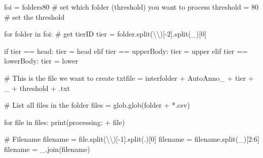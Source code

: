 \documentclass[
  letterpaper,
  DIV=11,
  numbers=noendperiod]{scrreprt}
\newenvironment{Shaded}{\begin{snugshade}}{\end{snugshade}}
\newcommand{\BuiltInTok}[1]{\textcolor[rgb]{0.00,0.23,0.31}{#1}}
\newcommand{\CharTok}[1]{\textcolor[rgb]{0.13,0.47,0.30}{#1}}
\newcommand{\CommentTok}[1]{\textcolor[rgb]{0.37,0.37,0.37}{#1}}
\newcommand{\ControlFlowTok}[1]{\textcolor[rgb]{0.00,0.23,0.31}{#1}}
\newcommand{\DecValTok}[1]{\textcolor[rgb]{0.68,0.00,0.00}{#1}}
\newcommand{\KeywordTok}[1]{\textcolor[rgb]{0.00,0.23,0.31}{#1}}
\newcommand{\NormalTok}[1]{\textcolor[rgb]{0.00,0.23,0.31}{#1}}
\newcommand{\OperatorTok}[1]{\textcolor[rgb]{0.37,0.37,0.37}{#1}}
\newcommand{\StringTok}[1]{\textcolor[rgb]{0.13,0.47,0.30}{#1}}
\begin{document}
\begin{Shaded}
\begin{Highlighting}[]
\NormalTok{foi }\OperatorTok{=}\NormalTok{ folders80 }\CommentTok{\# set which folder (threshold) you want to process}
\NormalTok{threshold }\OperatorTok{=} \StringTok{\textquotesingle{}80\textquotesingle{}} \CommentTok{\# set the threshold}

\ControlFlowTok{for}\NormalTok{ folder }\KeywordTok{in}\NormalTok{ foi:}
    \CommentTok{\# get tierID}
\NormalTok{    tier }\OperatorTok{=}\NormalTok{ folder.split(}\StringTok{\textquotesingle{}}\CharTok{\textbackslash{}\textbackslash{}}\StringTok{\textquotesingle{}}\NormalTok{)[}\OperatorTok{{-}}\DecValTok{2}\NormalTok{].split(}\StringTok{\textquotesingle{}\_\textquotesingle{}}\NormalTok{)[}\DecValTok{0}\NormalTok{]}

    \ControlFlowTok{if}\NormalTok{ tier }\OperatorTok{==} \StringTok{\textquotesingle{}head\textquotesingle{}}\NormalTok{:}
\NormalTok{        tier }\OperatorTok{=} \StringTok{\textquotesingle{}head\textquotesingle{}}
    \ControlFlowTok{elif}\NormalTok{ tier }\OperatorTok{==} \StringTok{\textquotesingle{}upperBody\textquotesingle{}}\NormalTok{:}
\NormalTok{        tier }\OperatorTok{=} \StringTok{\textquotesingle{}upper\textquotesingle{}}
    \ControlFlowTok{elif}\NormalTok{ tier }\OperatorTok{==} \StringTok{\textquotesingle{}lowerBody\textquotesingle{}}\NormalTok{:}
\NormalTok{        tier }\OperatorTok{=} \StringTok{\textquotesingle{}lower\textquotesingle{}}

    \CommentTok{\# This is the file we want to create}
\NormalTok{    txtfile }\OperatorTok{=}\NormalTok{ interfolder }\OperatorTok{+} \StringTok{\textquotesingle{}AutoAnno\_\textquotesingle{}} \OperatorTok{+}\NormalTok{ tier }\OperatorTok{+} \StringTok{\textquotesingle{}\_\textquotesingle{}} \OperatorTok{+}\NormalTok{ threshold }\OperatorTok{+} \StringTok{\textquotesingle{}.txt\textquotesingle{}}

    \CommentTok{\# List all files in the folder}
\NormalTok{    files }\OperatorTok{=}\NormalTok{ glob.glob(folder }\OperatorTok{+} \StringTok{\textquotesingle{}*.csv\textquotesingle{}}\NormalTok{)}

    \ControlFlowTok{for} \BuiltInTok{file} \KeywordTok{in}\NormalTok{ files:}
        \BuiltInTok{print}\NormalTok{(}\StringTok{\textquotesingle{}processing: \textquotesingle{}} \OperatorTok{+} \BuiltInTok{file}\NormalTok{)}

        \CommentTok{\# Filename}
\NormalTok{        filename }\OperatorTok{=} \BuiltInTok{file}\NormalTok{.split(}\StringTok{\textquotesingle{}}\CharTok{\textbackslash{}\textbackslash{}}\StringTok{\textquotesingle{}}\NormalTok{)[}\OperatorTok{{-}}\DecValTok{1}\NormalTok{].split(}\StringTok{\textquotesingle{}.\textquotesingle{}}\NormalTok{)[}\DecValTok{0}\NormalTok{]}
\NormalTok{        filename }\OperatorTok{=}\NormalTok{ filename.split(}\StringTok{\textquotesingle{}\_\textquotesingle{}}\NormalTok{)[}\DecValTok{2}\NormalTok{:}\DecValTok{6}\NormalTok{]}
\NormalTok{        filename }\OperatorTok{=} \StringTok{\textquotesingle{}\_\textquotesingle{}}\NormalTok{.join(filename)}


\end{Highlighting}
\end{Shaded}
\end{document}
